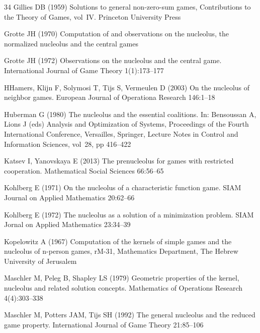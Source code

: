 \documentclass[a4paper,12pt]{article}
\theoremstyle{definition}
\theoremstyle{remark}
\begin{document}
\begin{thebibliography}{34}
Gillies DB (1959) {Solutions to general non-zero-sum games}, {Contributions to
  the Theory of Games}, vol~IV. Princeton University Press

Grotte JH (1970) Computation of and observations on the nucleolus, the
  normalized nucleolus and the central games

Grotte JH (1972) Observations on the nucleolus and the central game.
  International Journal of Game Theory 1(1):173--177

HHamers, Klijn F, Solymosi T, Tijs S, Vermeulen D (2003) On the nucleolus of
  neighbor games. European Journal of Operationa Research 146:1--18

Huberman G (1980) {The nucleolus and the essential coalitions}. In: Bensoussan
  A, Lions J (eds) {Analysis and Optimization of Systems, Proceedings of the
  Fourth International Conference, Versailles}, Springer, {Lecture Notes in
  Control and Information Sciences}, vol~28, pp 416--422

Katsev I, Yanovskaya E (2013) The prenucleolus for games with restricted
  cooperation. Mathematical Social Sciences 66:56--65

Kohlberg E (1971) {On the nucleolus of a characteristic function game}. SIAM
  Journal on Applied Mathematics 20:62--66

Kohlberg E (1972) The nucleolus as a solution of a minimization problem. SIAM
  Jornal on Applied Mathematics 23:34--39

Kopelowitz A (1967) Computation of the kernels of simple games and the
  nucleolus of n-person games, rM-31, Mathematics Department, The Hebrew
  University of Jerusalem

Maschler M, Peleg B, Shapley LS (1979) Geometric properties of the kernel,
  nucleolus and related solution concepts. Mathematics of Operations Research
  4(4):303--338

Maschler M, Potters JAM, Tijs SH (1992) The general nucleolus and the reduced
  game property. International Journal of Game Theory 21:85--106


\end{thebibliography}
\end{document}
